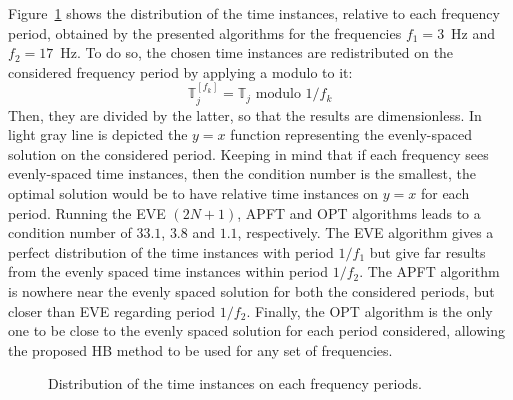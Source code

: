 Figure~\ref{fig:distribution_tlv} shows the distribution of the time
instances, relative to each frequency period, obtained by the presented
algorithms for the frequencies $f_1 = 3$~Hz and $f_2 = 17$~Hz. 
To do so, the chosen time instances are redistributed
on the considered frequency period by applying a modulo to it:
\begin{equation}
  \label{eq:1}
  \mathbb{T}^{[f_k]}_j =  \mathbb{T}_j \text{ modulo } 1/f_k
\end{equation}
Then, they are divided by the latter, so that the results are
dimensionless.  In light gray line is depicted the $y=x$ function
representing the evenly-spaced solution on the considered period.
Keeping in mind that if each frequency sees evenly-spaced time instances,
then the condition number is the smallest, the optimal solution would
be to have relative time instances on $y=x$ for each period.  Running the
EVE $(2N + 1)$, APFT and OPT algorithms leads to a condition number of $33.1$,
$3.8$ and $1.1$, respectively.  The EVE algorithm gives a perfect distribution
of the time instances with
period $1/f_1$ but give far results from the evenly spaced time instances
within period $1/f_2$. The APFT algorithm is nowhere near the evenly spaced
solution for both the considered periods, but closer than EVE regarding
period $1/f_2$. Finally, the OPT algorithm is the only one to be close
to the evenly spaced solution for each period considered, allowing 
the proposed HB method to be used for any set of frequencies.
\begin{figure}[htb]
  \centering 
  \caption{Distribution of the time instances on each frequency periods.}
  \label{fig:distribution_tlv}
\end{figure}
